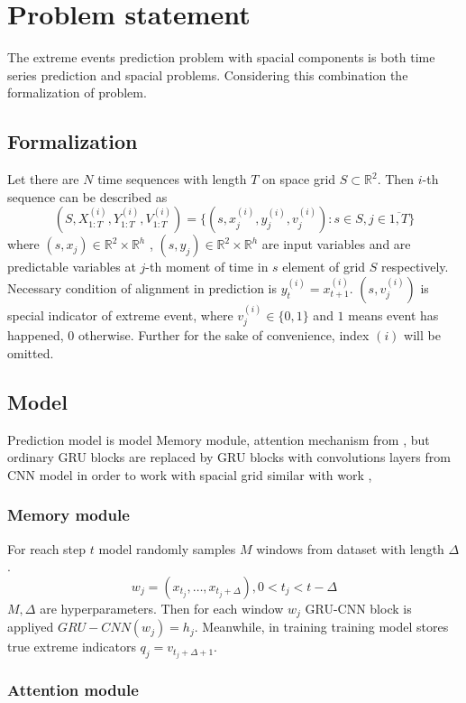 \documentclass{article}
\begin{document}
\section{Problem statement}
The extreme events prediction problem with spacial components is both time series prediction and spacial problems. Considering this combination the formalization of problem.
\subsection{Formalization}


Let there are $N$ time sequences with length $T$ on space grid $S  \subset \mathbb{R}^2$. Then $i$-th sequence can be described as
$$ (S , X^{(i)}_{1:T} , Y_{1:T}^{(i)}, V_{1:T}^{(i)}) =\{ (s, x^{(i)}_j,y^{(i)}_j, v^{(i)}_j) : s \in S , j \in \overline{1,T} \}$$  
where $(s,x_j) \in \mathbb{R}^2 \times \mathbb{R}^{h}$ , $(s,y_j) \in \mathbb{R}^2 \times \mathbb{R}^{h}$ are input variables  and  are predictable variables at $j$-th moment of time in $s$ element of grid $S$  respectively. Necessary condition of alignment in prediction is $y_t^{(i)} = x_{t+1}^{(i)}$. $(s, v_j^{(i)})$ is special indicator of extreme event, where $v_j^{(i)} \in \{0,1\}$ and $1$ means event has happened, $0$ otherwise.
Further for the sake of convenience, index $(i)$ will be omitted.

\subsection{Model}
Prediction model is model Memory module, attention mechanism  from \cite{EVL:1} , but ordinary GRU blocks are replaced by GRU blocks with convolutions layers from CNN model in order to work with spacial grid similar with work \cite{LSTMCNN:2}, \cite{GRUCNN:3}


\subsubsection{Memory module}
For reach step $t$ model randomly samples $M$ windows from dataset with length $\Delta$. 
$$w_j= (x_{t_j}, \dots, x_{t_j + \Delta}), 0< t_j < t - \Delta$$
$M, \Delta$ are hyperparameters.
Then for each window $w_j$ GRU-CNN block is appliyed $GRU-CNN(w_j) = h_j$. Meanwhile, in training training model stores true extreme indicators $q_j = v_{t_j + \Delta + 1}$.
\subsubsection{Attention module}
\end{document}
